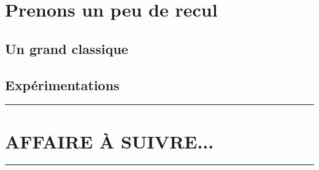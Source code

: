 \documentclass[12pt]{amsart}
\begin{document}






\section{Prenons un peu de recul} \label{general-case}

\subsection{Un grand classique}




\subsection{Expérimentations}




\bigskip

\hrule

\section{AFFAIRE À SUIVRE...}

\bigskip

\hrule




%
%
\end{document}
